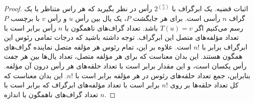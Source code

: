 \begin{solution}
\begin{proof}اثبات قضیه. 
یک ابرگراف با $2^{\binom{n}{2}}$ رأس در نظر بگیرید که هر راس متناظر با یک گراف  $n$ رأسی است. برای هر جایگشت $P$، یک یال بین رأس $u$ و رأس $v$ با برچسب $P$ رسم می‌کنیم اگر $T(u) = v$ باشد. تعداد گراف‌های ناهمگون با $n$ رأس برابر است با تعداد مؤلفه‌های متصل این ابرگراف. توجه داشته باشید که درجات تمامی رئوس این ابرگراف برابر با $n!$ است. علاوه بر این، تمام رئوس هر مؤلفه متصل نماینده گراف‌های همگون هستند. این بدان معناست که برای هر مؤلفه متصل، تعداد یال‌ها بین هر جفت رأس یکسان است، و این مقدار برابر است با تعداد حلقه‌های هر رأس درون آن مؤلفه. بنابراین، جمع تعداد حلقه‌های رئوس در هر مؤلفه برابر است با $n!$. این بدان معناست که کل تعداد حلقه‌ها بر روی $n!$ برابر است با تعداد مؤلفه‌های ابرگراف که برابر است با تعداد گراف‌های ناهمگون با اندازه $n$.
\end{proof}
\end{solution}
